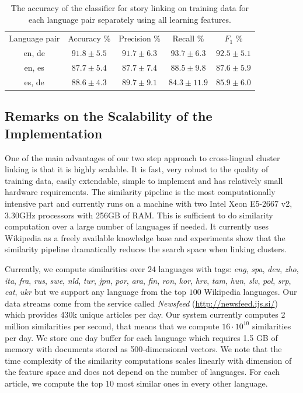 \begin{table}[t]
\caption[Story linking accuracy for several language pairs]{The accuracy of the classifier for story linking on training data for each language pair separately using all learning features.}
\begin{center}
\begin{tabular}{|c|c|c|c|c|}
  \hline
  \cline{1-5}
  Language pair & Accuracy \% & Precision \% & Recall \% & $F_1$ \% \\ \cline{1-5}
  en, de & $91.8 \pm 5.5$ & $91.7 \pm  6.3$ & $93.7 \pm  6.3$ & $92.5 \pm  5.1$ \\ \cline{1-5}
  en, es & $87.7 \pm 5.4$ & $87.7 \pm  7.4$ & $88.5 \pm  9.8$ & $87.6 \pm  5.9$ \\ \cline{1-5}
  es, de & $88.6 \pm 4.3$ & $89.7 \pm  9.1$ & $84.3 \pm 11.9$ & $85.9 \pm  6.0$ \\ \cline{1-5}
  \hline
\end{tabular}
\end{center}
\label{table:langPairEval}
\end{table}

\subsection{Remarks on the Scalability of the Implementation}

One of the main advantages of our two step approach to cross-lingual cluster linking is that it is highly scalable.
It is fast, very robust to the quality of training data, easily extendable, simple to implement
and has relatively small hardware requirements. The similarity pipeline is the most computationally
intensive part and currently runs on a machine with two Intel Xeon E5-2667 v2, 3.30GHz processors
with 256GB of RAM. This is sufficient to do similarity computation over a large number of
languages if needed. It currently uses Wikipedia as a freely available knowledge base
and experiments show that the similarity pipeline dramatically reduces the search space when linking clusters.

Currently, we compute similarities over $24$ languages with
tags: \emph{eng}, \emph{spa}, \emph{deu}, \emph{zho}, \emph{ita}, \emph{fra}, \emph{rus},
\emph{swe}, \emph{nld}, \emph{tur}, \emph{jpn}, \emph{por}, \emph{ara}, \emph{fin},
\emph{ron}, \emph{kor}, \emph{hrv}, \emph{tam}, \emph{hun}, \emph{slv}, \emph{pol},
\emph{srp}, \emph{cat}, \emph{ukr} but we support any language from the top $100$ Wikipedia languages.
Our data streams come from the service called \emph{Newsfeed} (\url{http://newsfeed.ijs.si/})
which provides 430k unique articles per day.
Our system currently computes 2 million similarities per second, that means that we
compute $16 \cdot 10^{10}$ similarities per day. We
store one day buffer for each language which requires 1.5 GB of memory with documents
stored as 500-dimensional vectors. We note that the time complexity of the similarity
computations scales linearly with dimension of the feature space and does not
depend on the number of languages. For each article, we compute the top $10$ most
similar ones in every other language.


